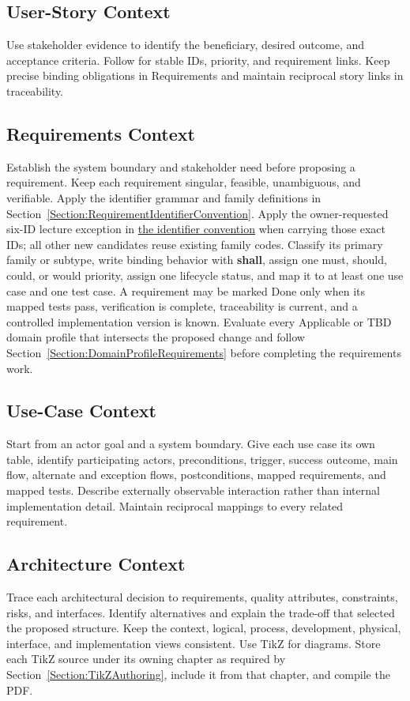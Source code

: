 \subsection{User-Story Context}
\label{Section:AIUserStoryContext}
Use stakeholder evidence to identify the beneficiary, desired outcome, and
acceptance criteria. Follow  for stable IDs, priority,
and requirement links. Keep precise binding obligations in Requirements and
maintain reciprocal story links in traceability.

\subsection{Requirements Context}
\label{Section:AIRequirementsContext}
Establish the system boundary and stakeholder need before proposing a
requirement. Keep each requirement singular, feasible, unambiguous, and
verifiable. Apply the identifier grammar and family definitions in
Section~\ref{Section:RequirementIdentifierConvention}. Apply the owner-requested six-ID lecture exception in
\hyperref[Section:LectureRequirementIDs]{the identifier convention} when carrying those exact IDs; all other new candidates reuse existing family codes. Classify its primary
family or subtype, write binding behavior with
\textbf{shall}, assign one \gls{must}, \gls{should}, \gls{could}, or
\gls{would} priority, assign one lifecycle status, and map it to at least one
use case and one test case. A requirement may be marked Done only when its
mapped tests pass, verification is complete, traceability is current, and a
controlled implementation version is known. Evaluate every Applicable or TBD
domain profile that intersects the proposed change and follow
Section~\ref{Section:DomainProfileRequirements} before completing the
requirements work.

\subsection{Use-Case Context}
\label{Section:AIUseCaseContext}
Start from an actor goal and a system boundary. Give each use case its own
table, identify participating actors, preconditions, trigger, success outcome,
main flow, alternate and exception flows, postconditions, mapped requirements,
and mapped tests. Describe externally observable interaction rather than
internal implementation detail. Maintain reciprocal mappings to every related
requirement.

\subsection{Architecture Context}
\label{Section:AIArchitectureContext}
Trace each architectural decision to requirements, quality attributes,
constraints, risks, and interfaces. Identify alternatives and explain the
trade-off that selected the proposed structure. Keep the context, logical,
process, development, physical, interface, and implementation views consistent.
Use TikZ for diagrams.
Store each TikZ source under its owning chapter as required by
Section~\ref{Section:TikZAuthoring}, include it from that chapter, and compile
the PDF.

